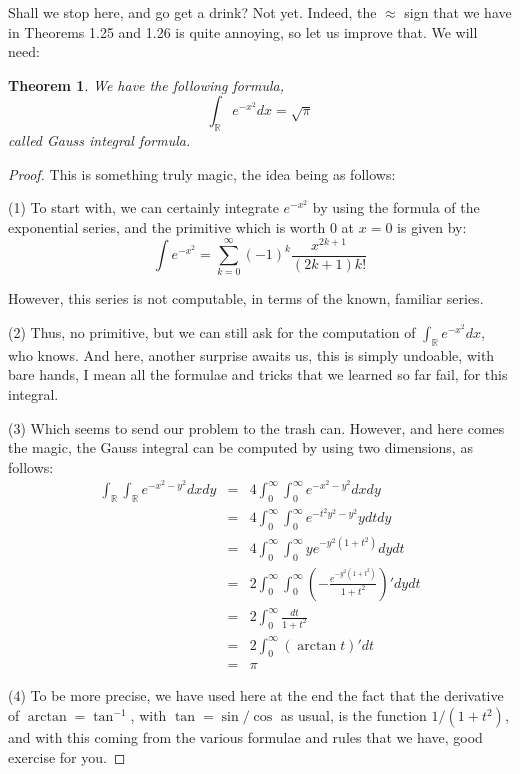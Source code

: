 \documentclass[12pt]{amsbook}
\newtheorem{theorem}{Theorem}[chapter]
\begin{document}
Shall we stop here, and go get a drink? Not yet. Indeed, the $\approx$ sign that we have in Theorems 1.25 and 1.26 is quite annoying, so let us improve that. We will need:

\begin{theorem}
We have the following formula,
$$\int_\mathbb Re^{-x^2}dx=\sqrt{\pi}$$
called Gauss integral formula.
\end{theorem}

\begin{proof}
This is something truly magic, the idea being as follows:

\medskip

(1) To start with, we can certainly integrate $e^{-x^2}$ by using the formula of the exponential series, and the primitive which is worth 0 at $x=0$ is given by:
$$\int e^{-x^2}=\sum_{k=0}^\infty(-1)^k\frac{x^{2k+1}}{(2k+1)k!}$$

However, this series is not computable, in terms of the known, familiar series.

\medskip

(2) Thus, no primitive, but we can still ask for the computation of $\int_\mathbb Re^{-x^2}dx$, who knows. And here, another surprise awaits us, this is simply undoable, with bare hands, I mean all the formulae and tricks that we learned so far fail, for this integral.

\medskip

(3) Which seems to send our problem to the trash can. However, and here comes the magic, the Gauss integral can be computed by using two dimensions, as follows:
\begin{eqnarray*}
\int_\mathbb R\int_\mathbb Re^{-x^2-y^2}dxdy
&=&4\int_0^\infty\int_0^\infty e^{-x^2-y^2}dxdy\\
&=&4\int_0^\infty\int_0^\infty e^{-t^2y^2-y^2}ydtdy\\
&=&4\int_0^\infty\int_0^\infty ye^{-y^2(1+t^2)}dydt\\
&=&2\int_0^\infty\int_0^\infty\left(-\frac{e^{-y^2(1+t^2)}}{1+t^2}\right)'dydt\\
&=&2\int_0^\infty\frac{dt}{1+t^2}\\
&=&2\int_0^\infty(\arctan t)'dt\\
&=&\pi
\end{eqnarray*}

(4) To be more precise, we have used here at the end the fact that the derivative of $\arctan=\tan^{-1}$, with $\tan=\sin/\cos$ as usual, is the function $1/(1+t^2)$, and with this coming from the various formulae and rules that we have, good exercise for you.
\end{proof}
\end{document}
